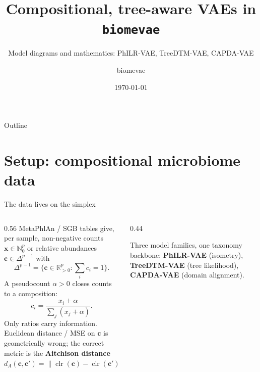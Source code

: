 \documentclass[aspectratio=169,11pt]{beamer}
\title[Compositional VAEs in biomevae]{Compositional, tree-aware VAEs in \texttt{biomevae}}
\subtitle{Model diagrams and mathematics: PhILR-VAE, TreeDTM-VAE, CAPDA-VAE}
\author{biomevae}
\date{\today}
\newcommand{\R}{\mathbb R}
\newcommand{\N}{\mathbb N}
\newcommand{\clr}{\operatorname{clr}}
\newcommand{\Simplex}{\Delta^{p-1}}
\begin{document}
{
\begin{frame}[plain]\titlepage\end{frame}}

\begin{frame}{Outline}
  \tableofcontents
\end{frame}

\section{Setup: compositional microbiome data}
\begin{frame}{The data lives on the simplex}
  \begin{columns}[T]
    \begin{column}{0.56\textwidth}
      MetaPhlAn / SGB tables give, per sample, non-negative counts
      $\mathbf x\in\N_0^{p}$ or relative abundances $\mathbf c\in\Simplex$ with
      \[
        \Simplex=\Big\{\mathbf c\in\R_{>0}^p : \textstyle\sum_i c_i = 1\Big\}.
      \]
      A pseudocount $\alpha>0$ closes counts to a composition:
      \[
        c_i=\frac{x_i+\alpha}{\sum_j (x_j+\alpha)}.
      \]
      \alert{Only ratios carry information.} Euclidean distance / MSE on
      $\mathbf c$ is geometrically wrong; the correct metric is the
      \textbf{Aitchison distance}
      \[
        d_A(\mathbf c,\mathbf c')=\Big\|\clr(\mathbf c)-\clr(\mathbf c')\Big\|_2,
        \quad
        \clr(\mathbf c)_i=\log\frac{c_i}{\big(\prod_j c_j\big)^{1/p}}.
      \]
    \end{column}
    \begin{column}{0.44\textwidth}
      \centering

      \vspace{0.6em}
      {\footnotesize Three model families, one taxonomy backbone:
      \textcolor{cSimplex}{\textbf{PhILR-VAE}} (isometry),
      \textcolor{cLik}{\textbf{TreeDTM-VAE}} (tree likelihood),
      \textcolor{cLatent}{\textbf{CAPDA-VAE}} (domain alignment).}
    \end{column}
  \end{columns}
\end{frame}
\end{document}
